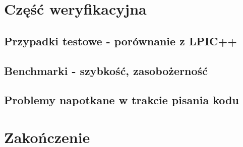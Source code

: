 \section{Część weryfikacyjna} %
\subsection{Przypadki testowe - porównanie z LPIC++}
\subsection{Benchmarki - szybkość, zasobożerność} %
\subsection{Problemy napotkane w trakcie pisania kodu}

\section{Zakończenie} %
